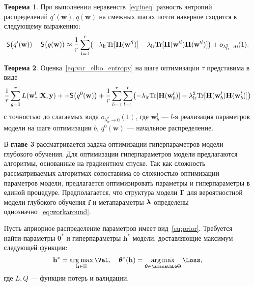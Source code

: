 \documentclass[11pt, a5paper]{dissert}
\theoremstyle{definition}
\newtheorem{theorem}{Теорема}
\DeclareMathOperator*{\argmax}{arg\,max}
\begin{document}
{\begin{theorem}
При выполнении неравенств~\eqref{eq:ineq} разность энтропий распределений $q'(\mathbf{w}), q(\mathbf{w})$ на смежных шагах почти наверное сходится к следующему выражению: 
\begin{equation}
\label{eq:entropy}
	\mathsf{S}\bigl(q'(\mathbf{w})) -  \mathsf{S}\bigl(q(\mathbf{w}))  \approx  \frac{1}{r}\sum_{l=1}^r \bigl(-\lambda_{\text{lr}} \textnormal{Tr}[\mathbf{H}(\mathbf{w}'^l)] - \lambda_{\text{lr}} \textnormal{Tr}[\mathbf{H}(\mathbf{w}'^l)\mathbf{H}(\mathbf{w}'^l)]  \bigr) + o_{\lambda_{\text{lr}}^2 \to 0}(1).
\end{equation}
\end{theorem}


\begin{theorem}\label{st:st2}
Оценка~\eqref{eq:var_elbo_entropy} на шаге оптимизации $\tau$ представима в виде
\begin{equation}
\label{eq:ev_grad_full}
 \frac{1}{r} \sum_{g = 1}^r L(\mathbf{w}^l_\tau| \mathbf{X}, \mathbf{y})  + +\mathsf{S}\big(q^0(\mathbf{w})\bigr) + \frac{1}{r}\sum_{b=1}^\tau\sum_{l=1}^r \bigl(-\lambda_{\text{lr}} \textnormal{Tr}[\mathbf{H}(\mathbf{w}_b^l)] - \lambda_{\text{lr}}^2 \textnormal{Tr}[\mathbf{H}(\mathbf{w}_b^l)\mathbf{H}(\mathbf{w}_b^l)]  \bigr) 
\end{equation}
с точностью до слагаемых вида $o_{\lambda_{\text{lr}}^2 \to 0}(1)$,
где $\mathbf{w}_b^l$ --- $l$-я реализация параметров модели на шаге оптимизации $b$, $q^0(\mathbf{w})$ --- начальное распределение.
\end{theorem}

В \textbf{главе 3} рассматривается задача оптимизации гиперпараметров модели глубокого обучения. Для оптимизации гиперпараметров модели предлагаются алгоритмы, основанные на градиентном спуске. Так как сложность рассматриваемых алгоритмах сопоставима со сложностью оптимизации параметров модели, предлагается оптимизировать параметры и гиперпараметры в единой процедуре. Предполагается, что структура модели $\boldsymbol{\Gamma}$ для вероятностной модели глубокого обучения $\mathbf{f}$ и метапараметры $\boldsymbol{\lambda}$ определены однозначно~\eqref{eq:workaround}.

Пусть априорное распределение параметров имеет вид~\eqref{eq:prior}. Требуется найти параметры ${\boldsymbol{\theta}}^{*}$ и гиперпараметры $\mathbf{h}^{*}$ модели, доставляющие максимум следующей функции:
\begin{equation}
\label{eq:main}
    \mathbf{h}^{*} = \argmax_{\mathbf{h} \in \mathbb{H}} \Val, \quad \boldsymbol{\theta}^{*}(\mathbf{h}) =  \argmax_{\boldsymbol{\theta} \in \Tetab} \Loss,
\end{equation}
где $L,Q$ --- функции потерь и валидации.

}
\end{document}
